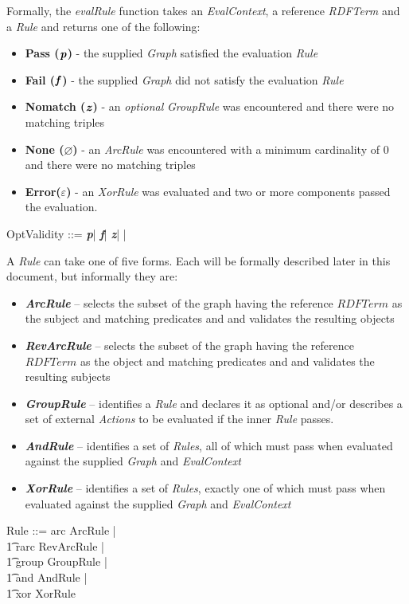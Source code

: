 \documentclass[fuzz]{llncs}
\def\pass{\textbf{\textit{p}}}
\def\fail{\textbf{\textit{f}}}
\def\none{\varnothing}
\def\error{\varepsilon}
\def\nomatch{\textbf{\textit{z}}}
\def\zc{\textit}
\begin{document}
Formally, the \zc{evalRule} function takes an \zc{EvalContext}, a reference \zc{RDFTerm} and a \zc{Rule} and returns one of the following:
\begin{itemize}
\item \textbf{Pass ($\pass$)} - the supplied \zc{Graph} satisfied the evaluation \zc{Rule}
\item \textbf{Fail ($\fail$)} - the supplied \zc{Graph} did not satisfy the evaluation \zc{Rule}
\item \textbf{Nomatch ($\nomatch$)} - an \zc{optional} \zc{GroupRule} was encountered and there were no matching triples
\item \textbf{None ($\none$)} - an \zc{ArcRule} was encountered with a minimum cardinality of 0 and there were no matching triples
\item \textbf{Error($\error$)} - an \zc{XorRule} was evaluated and two or more components passed the evaluation.
\end{itemize}
\begin{zed}
OptValidity ::= \pass | \fail | \nomatch | \none | \error \\
\end{zed}
A  \zc{Rule} can take one of five forms. Each will be formally described later in this
document, but informally they are:
\begin{itemize}
\item \textbf{\zc{ArcRule}} -- selects the subset of the graph having the reference ${RDFTerm}$ as the subject and matching predicates and and validates the resulting objects
\item \textbf{\zc{RevArcRule}} -- selects the subset of the graph having the reference ${RDFTerm}$ as the object and matching predicates and and validates the resulting subjects 
\item \textbf{\zc{GroupRule}} -- identifies a \zc{Rule} and declares it as optional and/or
describes a set of external \zc{Actions} to be evaluated if the inner \zc{Rule} passes.
\item \textbf{\zc{AndRule}} -- identifies a set of \zc{Rules}, all of which must pass when
evaluated against the supplied \zc{Graph} and \zc{EvalContext}
\item \textbf{\zc{XorRule}} -- identifies a set of \zc{Rules}, exactly one of which must pass when
evaluated against the supplied \zc{Graph} and \zc{EvalContext}
\end{itemize}
\begin{zed}
Rule ::= arc \ldata ArcRule \rdata | \\
\t1 rarc \ldata RevArcRule \rdata | \\
\t1 group \ldata GroupRule \rdata | \\
\t1 and \ldata AndRule \rdata | \\
\t1 xor \ldata XorRule \rdata \\
\end{zed}
\end{document}
